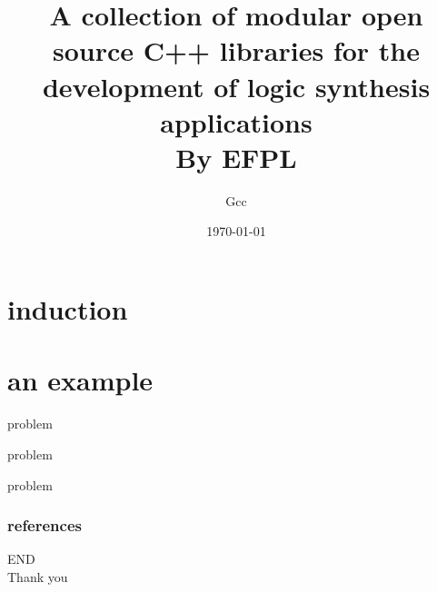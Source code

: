 \documentclass[aspectratio=1610]{beamer}
\title{A collection of modular open source C++ libraries for the development of logic synthesis applications\\ By EFPL}
\author{Gcc}
\date\today
\begin{document}
\begin{frame}[plain]
  \titlepage
\end{frame}
\section{induction}
\begin{frame}
  
\end{frame}

\section{an example}
\begin{frame}{problem}
\end{frame}
\begin{frame}{problem}
\end{frame}
\begin{frame}{problem}
\end{frame}
\begin{frame}
	\frametitle{references}
	\printbibliography
\end{frame}
\begin{frame}
\centering
\Huge{END\\Thank you}
\end{frame}
\end{document}
